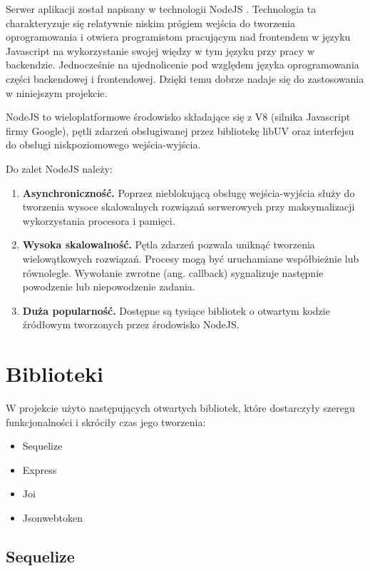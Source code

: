 \documentclass{sprz}
\begin{document}
Serwer aplikacji został napisany w technologii NodeJS \cite{nodejs}. Technologia ta charakteryzuje się relatywnie niskim prógiem wejścia do tworzenia oprogramowania i otwiera programistom pracującym nad frontendem w języku Javascript na wykorzystanie swojej więdzy w tym języku przy pracy w backendzie. Jednocześnie na ujednolicenie pod względem języka oprogramowania części backendowej i frontendowej. Dzięki temu dobrze nadaje się do zastosowania w niniejszym projekcie.

NodeJS to wieloplatformowe środowisko składające się z V8 (silnika Javascript firmy Google), pętli zdarzeń obsługiwanej przez bibliotekę libUV oraz interfejsu do obsługi niskpoziomowego wejścia-wyjścia.

Do zalet NodeJS należy:
\begin{enumerate}
  \item \textbf{Asynchroniczność.} Poprzez nieblokującą obsługę wejścia-wyjścia służy do tworzenia wysoce skalowalnych rozwiązań serwerowych przy maksymalizacji wykorzystania procesora i pamięci.
  \item \textbf{Wysoka skalowalność.} Pętla zdarzeń pozwala uniknąć tworzenia wielowątkowych rozwiązań. Procesy mogą być uruchamiane współbieżnie lub równolegle. Wywołanie zwrotne (ang. callback) sygnalizuje następnie powodzenie lub niepowodzenie zadania.
  \item \textbf{Duża popularność.} Dostępne są tysiące bibliotek o otwartym kodzie źródłowym tworzonych przez środowisko NodeJS.
\end{enumerate}

\section{Biblioteki}

W projekcie użyto następujących otwartych bibliotek, które dostarczyły szeregu funkcjonalności i skróciły czas jego tworzenia:
\begin{itemize}
  \item Sequelize
  \item Express
  \item Joi
  \item Jsonwebtoken
\end{itemize}

\subsection{Sequelize}
\end{document}

